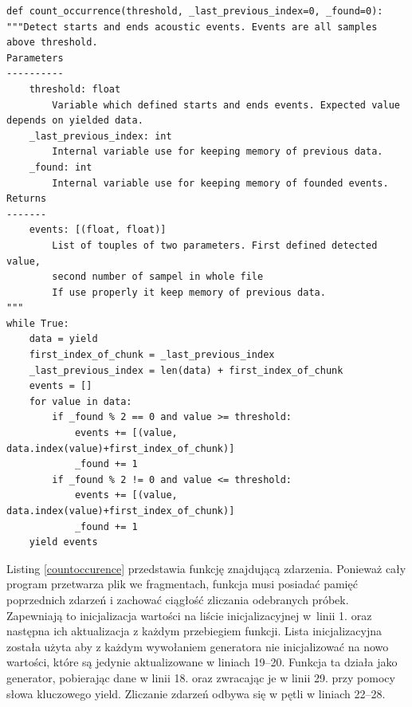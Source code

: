 \documentclass[eng,printmode]{mgr}
\begin{document}
\begin{minipage}{\linewidth}
\begin{lstlisting}[caption={fragment kodu źródłowego pliku Detectors.py,\newline klasa ThresholdCrossDetector, metoda count\_occurrence},captionpos=b,label={countoccurence}]     
    def count_occurrence(threshold, _last_previous_index=0, _found=0):
"""Detect starts and ends acoustic events. Events are all samples above threshold.
Parameters
----------
    threshold: float
        Variable which defined starts and ends events. Expected value depends on yielded data.
    _last_previous_index: int
        Internal variable use for keeping memory of previous data.
    _found: int
        Internal variable use for keeping memory of founded events.
Returns
-------
    events: [(float, float)]
        List of touples of two parameters. First defined detected value,
        second number of sampel in whole file
        If use properly it keep memory of previous data.
"""
while True:
    data = yield
    first_index_of_chunk = _last_previous_index
    _last_previous_index = len(data) + first_index_of_chunk
    events = []
    for value in data:
        if _found % 2 == 0 and value >= threshold:
            events += [(value, data.index(value)+first_index_of_chunk)]
            _found += 1
        if _found % 2 != 0 and value <= threshold:
            events += [(value, data.index(value)+first_index_of_chunk)]
            _found += 1
    yield events
\end{lstlisting}
\end{minipage}

Listing \ref{countoccurence} przedstawia funkcję znajdującą zdarzenia. Ponieważ cały program przetwarza plik we fragmentach, funkcja musi posiadać pamięć poprzednich zdarzeń i zachować ciągłość zliczania odebranych próbek. Zapewniają to inicjalizacja wartości na liście inicjalizacyjnej w~linii  1. oraz następna ich aktualizacja z każdym przebiegiem funkcji. Lista inicjalizacyjna została użyta aby z każdym wywołaniem generatora nie inicjalizować na nowo wartości, które są jedynie aktualizowane w liniach 19--20. Funkcja ta działa jako generator, pobierając dane w linii 18. oraz zwracając je w linii 29. przy pomocy słowa kluczowego yield. Zliczanie zdarzeń odbywa się w pętli w liniach 22--28.
\end{document}
